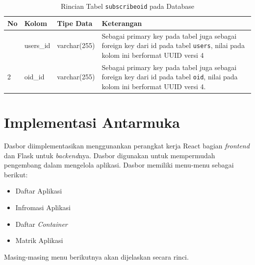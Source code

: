     	\begin{longtable}{|p{}|p{}|p{}|p{}|} %
    		
    		\caption{Rincian Tabel \texttt{subscribeoid} pada Database} \label{tabeldbsubscribeoid} \\
    		\hline
    		\textbf{No} & \textbf{Kolom} & \textbf{Tipe Data} & \textbf{Keterangan} \\ \hline
    		\endhead
    		\endfoot
    		\endlastfoot
    		1 & users\_id & varchar(255) & Sebagai primary key pada tabel juga sebagai foreign key dari id pada tabel \texttt{users}, nilai pada kolom ini berformat UUID versi 4 \\ \hline
    		2 & oid\_id & varchar(255) & Sebagai primary key pada tabel juga sebagai foreign key dari id pada tabel \texttt{oid}, nilai pada kolom ini berformat UUID versi 4. \\ \hline
    	\end{longtable} 

    \section{Implementasi Antarmuka}
    	Dasbor diimplementasikan menggunankan perangkat kerja React bagian \textit{frontend} dan Flask untuk \textit{backend}nya. Dasbor digunakan untuk mempermudah pengembang dalam mengelola aplikasi. Dasbor memiliki menu-menu sebagai berikut:
        \begin{itemize}
        \item Daftar Aplikasi
        \item Infromasi Aplikasi
        \item Daftar \textit{Container}
        \item Matrik Aplikasi
        \end{itemize}
        \indent Masing-masing menu berikutnya akan dijelaskan secara rinci.

